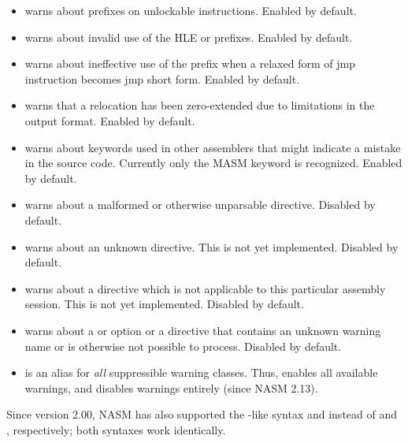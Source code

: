 \begin{itemize}
	\item {} warns about  prefixes on unlockable
	instructions. Enabled by default.

	\item {} warns about invalid use of the HLE 
	or  prefixes. Enabled by default.

	\item {} warns about ineffective use of the 
	prefix when a relaxed form of jmp instruction becomes jmp short form.
	Enabled by default.

	\item {} warns that a relocation has been
	zero-extended due to limitations in the output format. Enabled by default.

	\item {} warns about keywords used in other assemblers that might
	indicate a mistake in the source code. Currently only the MASM
	 keyword is recognized. Enabled by default.

	\item {} warns about a malformed or otherwise unparsable
	 directive. Disabled by default.

	\item {} warns about an unknown  directive.
	This is not yet implemented. Disabled by default.

	\item {} warns about a  directive which is
	not applicable to this particular assembly session. This is not yet
	implemented. Disabled by default.

	\item {} warns about a  or  option or a
	\code{[WARNING]} directive that contains an unknown warning name or is
	otherwise not possible to process. Disabled by default.

	\item {} is an alias for \emph{all} suppressible warning classes.
	Thus,  enables all available warnings, and 
	disables warnings entirely (since NASM 2.13).
\end{itemize}

Since version 2.00, NASM has also supported the -like syntax
 and  instead of
 and , respectively; both
syntaxes work identically.

